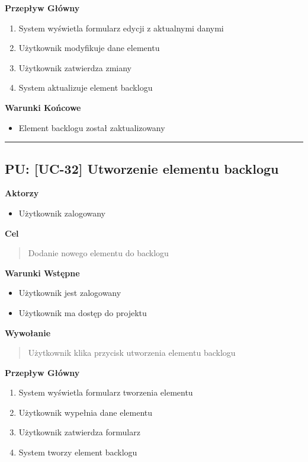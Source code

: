 \vspace{0.2cm}
\noindent\textbf{Przepływ Główny}
\begin{enumerate}
    \item System wyświetla formularz edycji z aktualnymi danymi
    \item Użytkownik modyfikuje dane elementu
    \item Użytkownik zatwierdza zmiany
    \item System aktualizuje element backlogu
\end{enumerate}

\vspace{0.2cm}
\noindent\textbf{Warunki Końcowe}
\begin{itemize}
    \item Element backlogu został zaktualizowany
\end{itemize}


\hrule
\vspace{1cm}

\subsection*{PU: [UC-32] Utworzenie elementu backlogu}

\noindent\textbf{Aktorzy}
\begin{itemize}
    \item Użytkownik zalogowany
\end{itemize}

\vspace{0.2cm}
\noindent\textbf{Cel}
\begin{quote}
    Dodanie nowego elementu do backlogu
\end{quote}

\vspace{0.2cm}
\noindent\textbf{Warunki Wstępne}
\begin{itemize}
    \item Użytkownik jest zalogowany
    \item Użytkownik ma dostęp do projektu
\end{itemize}

\vspace{0.2cm}
\noindent\textbf{Wywołanie}
\begin{quote}
    Użytkownik klika przycisk utworzenia elementu backlogu
\end{quote}

\vspace{0.2cm}
\noindent\textbf{Przepływ Główny}
\begin{enumerate}
    \item System wyświetla formularz tworzenia elementu
    \item Użytkownik wypełnia dane elementu
    \item Użytkownik zatwierdza formularz
    \item System tworzy element backlogu
\end{enumerate}

